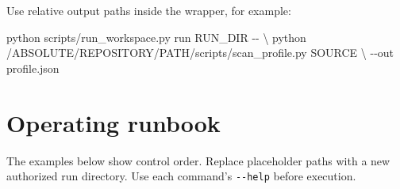 \documentclass[
]{article}
\newenvironment{Shaded}{}{}
\newcommand{\AttributeTok}[1]{\textcolor[rgb]{0.49,0.56,0.16}{#1}}
\newcommand{\DataTypeTok}[1]{\textcolor[rgb]{0.56,0.13,0.00}{#1}}
\newcommand{\ExtensionTok}[1]{#1}
\newcommand{\NormalTok}[1]{#1}
\begin{document}
Use relative output paths inside the wrapper, for example:

\begin{Shaded}
\begin{Highlighting}[]
\ExtensionTok{python}\NormalTok{ scripts/run\_workspace.py run RUN\_DIR }\AttributeTok{{-}{-}} \DataTypeTok{\textbackslash{}}
\NormalTok{  python /ABSOLUTE/REPOSITORY/PATH/scripts/scan\_profile.py SOURCE }\DataTypeTok{\textbackslash{}}
  \AttributeTok{{-}{-}out}\NormalTok{ profile.json}
\end{Highlighting}
\end{Shaded}

\section{Operating runbook}\label{operating-runbook}

The examples below show control order. Replace placeholder paths with a
new authorized run directory. Use each command's \texttt{-\/-help}
before execution.
\end{document}
